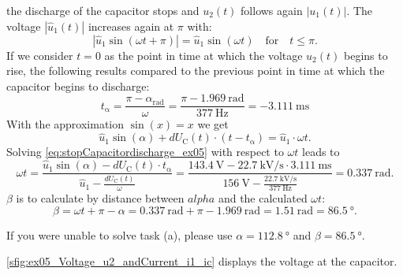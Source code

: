 \begin{solutionblock}
    the discharge of the capacitor stops and $u_\mathrm{2}(t)$ follows again $\left| u_\mathrm{1}(t) \right|$.
    The voltage $\left| \hat{u}_\mathrm{1}(t) \right|$ increases again at $\pi$ with:
    \begin{equation}
        \left| \hat{u}_\mathrm{1}\sin(\omega t + \pi ) \right| = \hat{u}_\mathrm{1}\sin(\omega t) \quad \text{for} \quad t \leq \pi.
    \end{equation}
    If we consider $t=0$ as the point in time at which the voltage $u_\mathrm{2}(t)$ begins to rise, the following 
    results compared to the previous point in time at which the capacitor begins to discharge:      
    \begin{equation}
        t_\mathrm{\alpha}=\frac{\pi - \alpha_\mathrm{rad}}{\omega} = 
        \frac{\pi - \SI{1.969}{\radian}}{\SI{377}{\hertz}} = \SI{-3.111}{\milli\second}
    \end{equation}   
    With the approximation $\sin(x) = x$ we get
    \begin{equation}
        \hat{u}_\mathrm{1}\sin(\alpha) + dU_\mathrm{C}(t) \cdot (t-t_\mathrm{\alpha}) = \hat{u}_\mathrm{1}\cdot \omega t.
        \label{eq:stopCapacitordischarge_ex05}
    \end{equation}   
    Solving \eqref{eq:stopCapacitordischarge_ex05} with respect to $\omega t$ leads to
    \begin{equation}
        \omega t = \frac{\hat{u}_\mathrm{1}\sin(\alpha) - dU_\mathrm{C}(t) \cdot t_\mathrm{\alpha}}
                   {\hat{u}_\mathrm{1}-\frac{dU_\mathrm{C}(t)}{\omega}}=
                   \frac{\SI{143.4}{\volt} - \SI{22.7}{\kilo\volt/\second} \cdot \SI{3.111}{\milli\second}}
                   {\SI{156}{\volt}-\frac{\SI{22.7}{\kilo\volt/\second}}{\SI{377}{\hertz}}}=\SI{0.337}{\radian}.
    \end{equation}
    $\beta$ is to calculate by distance between $alpha$ and the calculated $\omega t$:
    \begin{equation}
        \beta=\omega t + \pi - \alpha = \SI{0.337}{\radian} + \pi - \SI{1.969}{\radian}
        = \SI{1.51}{\radian} = \SI{86.5}{\degree}.
    \end{equation}
\end{solutionblock}

\vspace{2em}\par
If you were unable to solve task (a), please use $\alpha=\SI{112.8}{\degree}$ and $\beta=\SI{86.5}{\degree}$.

\begin{solutionblock}
    \autoref{sfig:ex05_Voltage_u2_andCurrent_i1_ic} displays the voltage at the capacitor.
      
\end{solutionblock}

